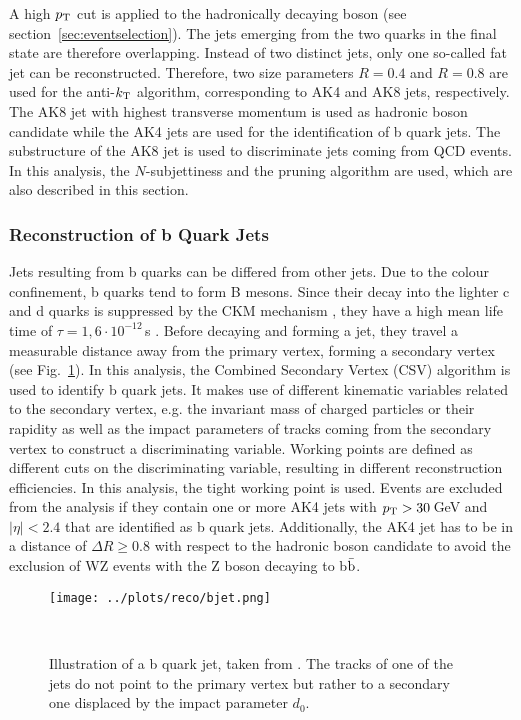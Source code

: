 \noindent A high $p_{\rm T}$ cut is applied to the hadronically decaying boson (see section~\ref{sec:eventselection}). The jets emerging from the two quarks in the final state are therefore overlapping. Instead of two distinct jets, only one so-called fat jet can be reconstructed. Therefore, two size parameters $R=0.4$ and $R=0.8$ are used for the anti-$k_{\rm T}$ algorithm, corresponding to AK4 and AK8 jets, respectively. The AK8 jet with highest transverse momentum is used as hadronic boson candidate while the AK4 jets are used for the identification of b quark jets. The substructure of the AK8 jet is used to discriminate jets coming from QCD events. In this analysis, the $N$-subjettiness and the pruning algorithm are used, which are also described in this section.

\subsubsection*{Reconstruction of b Quark Jets}
Jets resulting from b quarks can be differed from other jets. Due to the colour confinement, b quarks tend to form B mesons. Since their decay into the lighter c and d quarks is suppressed by the CKM mechanism \cite{CKM}, they have a high mean life time of $\tau=1,6\cdot 10^{-12}$\,s \cite{SMmasses}. Before decaying and forming a jet, they travel a measurable distance away from the primary vertex, forming a secondary vertex (see Fig.~\ref{fig:reco:bjet}). In this analysis, the Combined Secondary Vertex (CSV) algorithm \cite{CSV1,CSV2} is used to identify b quark jets. It makes use of different kinematic variables related to the secondary vertex, e.g. the invariant mass of charged particles or their rapidity as well as the impact parameters of tracks coming from the secondary vertex to construct a discriminating variable. Working points are defined as different cuts on the discriminating variable, resulting in different reconstruction efficiencies. In this analysis, the tight working point is used. Events are excluded from the analysis if they contain one or more AK4 jets with $p_{\rm T}>30$\,GeV and $|\eta|<2.4$ that are identified as b quark jets. Additionally, the AK4 jet has to be in a distance of $\Delta R \geq 0.8$ with respect to the hadronic boson candidate to avoid the exclusion of WZ events with the Z boson decaying to b$\bar{\rm b}$.
\begin{figure}
    \centering
    \texttt{[image: ../plots/reco/bjet.png]}
    \caption[Illustration of a b quark jet]{Illustration of a b quark jet, taken from \cite{bjet}. The tracks of one of the jets do not point to the primary vertex but rather to a secondary one displaced by the impact parameter $d_0$.}\
    \label{fig:reco:bjet}
\end{figure}

